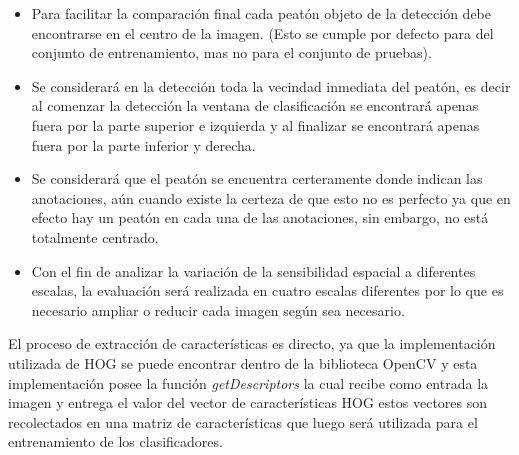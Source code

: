 \begin{itemize}
\item Para facilitar la comparación final cada peatón objeto de la detección debe encontrarse en el centro de la imagen. (Esto se cumple por defecto para del conjunto de entrenamiento, mas no para el conjunto de pruebas). 

\item Se considerará en la detección toda la vecindad inmediata del peatón, es decir al comenzar la detección la ventana de clasificación se encontrará apenas fuera por la parte superior e izquierda y al finalizar se encontrará apenas fuera por la parte inferior y derecha.

\item Se considerará que el peatón se encuentra certeramente donde indican las anotaciones, aún cuando existe la certeza de que esto no es perfecto ya que en efecto hay un peatón en cada una de las anotaciones, sin embargo, no está totalmente centrado.

\item Con el fin de analizar la variación de la sensibilidad espacial a diferentes escalas, la evaluación será realizada en cuatro escalas diferentes por lo que es necesario ampliar o reducir cada imagen según sea necesario. 
\end{itemize}

El proceso de extracción de características es directo, ya que la implementación utilizada de HOG se puede encontrar dentro de la biblioteca OpenCV y esta implementación posee la función \textit{getDescriptors} la cual recibe como entrada la imagen y entrega el valor del vector de características HOG estos vectores son recolectados en una matriz de características que luego será utilizada para el entrenamiento de los clasificadores.

